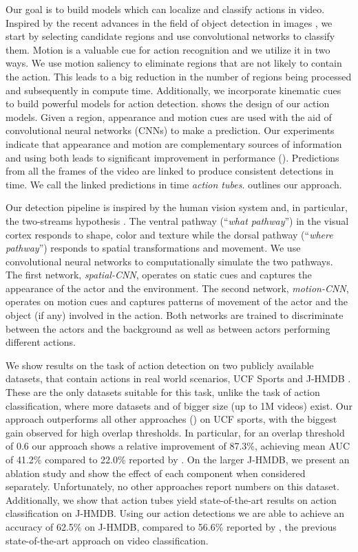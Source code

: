 \documentclass[10pt,twocolumn,letterpaper]{article}
\begin{document}
Our goal is to build models which can localize and classify actions in video. Inspired by the recent advances in the field of object detection in images \cite{girshick2014rcnn}, we start by selecting candidate regions and use convolutional networks to classify them. Motion is a valuable cue for action recognition and we utilize it in two ways. We use motion saliency to eliminate regions that are not likely to contain the action. This leads to a big reduction in the number of regions being processed and subsequently in compute time. Additionally, we incorporate kinematic cues to build powerful models for action detection.  shows the design of our action models. Given a region, appearance and motion cues are used with the aid of convolutional neural networks (CNNs) to make a prediction. Our experiments indicate that appearance and motion are complementary sources of information and using both leads to significant improvement in performance (). Predictions from all the frames of the video are linked to produce consistent detections in time. We call the linked predictions in time \textit{action tubes}.  outlines our approach.

Our detection pipeline is inspired by the human vision system and, in particular, the two-streams hypothesis  \cite{GoodaleMilner92}. The ventral pathway (``\textit{what pathway}'') in the visual cortex responds to shape, color and texture while the dorsal pathway (``\textit{where pathway}'') responds to spatial transformations and movement. We use convolutional neural networks to computationally simulate the two pathways. The first network, \textit{spatial-CNN}, operates on static cues and captures the appearance of the actor and the environment. The second network, \textit{motion-CNN}, operates on motion cues and captures patterns of movement of the actor and the object (if any) involved in the action. Both networks are trained to discriminate between the actors and the background as well as between actors performing different actions. 

We show results on the task of action detection on two  publicly available datasets, that contain actions in real world scenarios, UCF Sports \cite{UCFsports} and J-HMDB \cite{J-HMDB}. These are the only datasets suitable for this task, unlike the task of action classification, where more datasets and of bigger size (up to 1M videos) exist.
Our approach outperforms all other approaches (\cite{Jain2014,WangQT14,SDPM,LanWM11}) on UCF sports, with the biggest gain observed for high overlap thresholds. In particular, for an overlap threshold of 0.6 our approach shows a relative improvement of 87.3\%, achieving mean AUC of 41.2\% compared to 22.0\% reported by \cite{WangQT14}. On the larger J-HMDB, we present an ablation study and show the effect of each component when considered separately. Unfortunately, no other approaches report numbers on this dataset. Additionally, we show that action tubes yield state-of-the-art results on action classification on J-HMDB. Using our action detections we are able to achieve an accuracy of 62.5\% on J-HMDB, compared to 56.6\% reported by \cite{wang2011}, the previous state-of-the-art approach on video classification.
\end{document}
